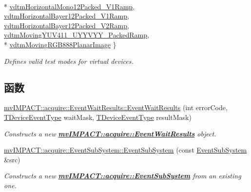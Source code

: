 \begin{DoxyCompactItemize}
\\*
\hyperlink{group___device_specific_interface_gga7d26416f3dfdd24d6331fcf6bfd32a38a88ec563ff28e610fded542bfbd9f4c06}{vdtm\+Horizontal\+Mono12\+Packed\+\_\+\+V1\+Ramp}, 
\hyperlink{group___device_specific_interface_gga7d26416f3dfdd24d6331fcf6bfd32a38aedc51008da4bbbec73e9f9207c1dce0c}{vdtm\+Horizontal\+Bayer12\+Packed\+\_\+\+V1\+Ramp}, 
\hyperlink{group___device_specific_interface_gga7d26416f3dfdd24d6331fcf6bfd32a38a82edcf4b565b4c54369c8debf7db29d3}{vdtm\+Horizontal\+Bayer12\+Packed\+\_\+\+V2\+Ramp}, 
\hyperlink{group___device_specific_interface_gga7d26416f3dfdd24d6331fcf6bfd32a38a8bcdb15378466981f729aafadd7e4fdc}{vdtm\+Moving\+Y\+U\+V411\+\_\+\+U\+Y\+Y\+V\+Y\+Y\+\_\+\+Packed\+Ramp}, 
\\*
\hyperlink{group___device_specific_interface_gga7d26416f3dfdd24d6331fcf6bfd32a38a1d95993b5e99938820b66d80af3da3e8}{vdtm\+Moving\+R\+G\+B888\+Planar\+Image}
 \}
\begin{DoxyCompactList}\small\item\em Defines valid test modes for virtual devices. \end{DoxyCompactList}\end{DoxyCompactItemize}
\subsection*{函数}
\begin{DoxyCompactItemize}
\item 
\hyperlink{group___device_specific_interface_ga6f53d7cf6f361a7a87d468be369c6a1e}{mv\+I\+M\+P\+A\+C\+T\+::acquire\+::\+Event\+Wait\+Results\+::\+Event\+Wait\+Results} (int error\+Code, \hyperlink{group___common_interface_ga0947eb7d6a73b9baab283cbf65cd8d6b}{T\+Device\+Event\+Type} wait\+Mask, \hyperlink{group___common_interface_ga0947eb7d6a73b9baab283cbf65cd8d6b}{T\+Device\+Event\+Type} result\+Mask)
\begin{DoxyCompactList}\small\item\em Constructs a new {\bfseries \hyperlink{classmv_i_m_p_a_c_t_1_1acquire_1_1_event_wait_results}{mv\+I\+M\+P\+A\+C\+T\+::acquire\+::\+Event\+Wait\+Results}} object. \end{DoxyCompactList}\item 
\hyperlink{group___device_specific_interface_gadb3fa35ca8658058536b71acba5934bf}{mv\+I\+M\+P\+A\+C\+T\+::acquire\+::\+Event\+Sub\+System\+::\+Event\+Sub\+System} (const \hyperlink{classmv_i_m_p_a_c_t_1_1acquire_1_1_event_sub_system}{Event\+Sub\+System} \&src)
\begin{DoxyCompactList}\small\item\em Constructs a new {\bfseries \hyperlink{classmv_i_m_p_a_c_t_1_1acquire_1_1_event_sub_system}{mv\+I\+M\+P\+A\+C\+T\+::acquire\+::\+Event\+Sub\+System}} from an existing one. \end{DoxyCompactList}\end{DoxyCompactItemize}


